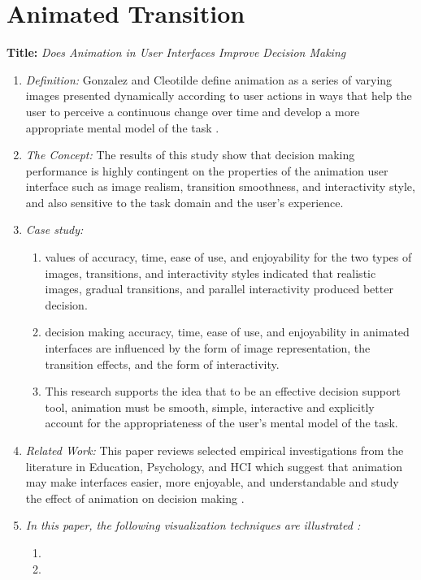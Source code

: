 \documentclass{egpubl}
\begin{document}
\label{fig:ferreira2013}
\endgroup

\section{Animated Transition}
\textbf{Title:} \textit{Does Animation in User Interfaces Improve Decision Making}
\begin{enumerate}
\item \textit{Definition:} Gonzalez and Cleotilde define animation as a series of varying images presented dynamically according to user actions in ways that help the user to perceive a continuous change over time and develop a more appropriate mental model of the task \cite{gonzalez1995animation}.
\item \textit{The Concept:} The results of this study show that decision making performance is highly contingent on the properties of the animation user interface such as image realism, transition smoothness, and interactivity style, and also sensitive to the task domain and the user's experience.  
\item \textit{Case study:}
\begin{enumerate}
\item values of accuracy, time, ease of use, and enjoyability for the two types of images, transitions, and interactivity styles indicated that realistic images, gradual transitions, and parallel interactivity produced better decision.
\item decision making accuracy, time, ease of use, and enjoyability in animated interfaces are influenced by the form of image representation, the transition effects, and the form of interactivity.
\item This research supports the idea that to be an effective decision support tool, animation must be smooth, simple, interactive and explicitly account for the appropriateness of the user's mental model of the task.
\end{enumerate}
\item \textit{Related Work:} This paper reviews selected empirical investigations from the literature in Education, Psychology, and HCI which suggest that animation may make interfaces easier, more enjoyable, and understandable and study the effect of animation on decision making \cite{gonzalez1996does}.
\item \textit{In this paper, the following visualization techniques are illustrated :} 
\begin{enumerate}
\item 
\item 
\end{enumerate}
\end{enumerate}
\end{document}
